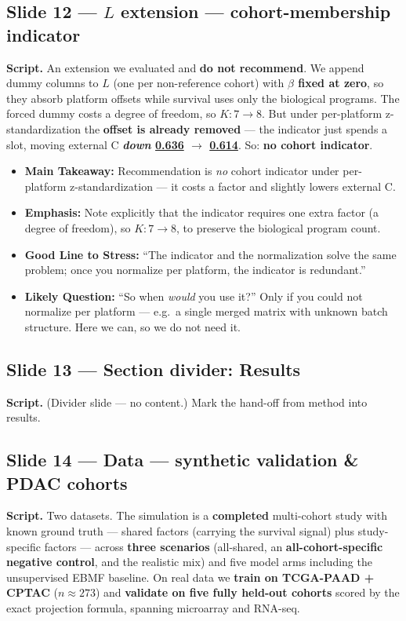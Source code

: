 \documentclass[11pt]{article}
\newcommand{\scriptlabel}{\textbf{Script. }}
\newcommand{\sectionlabel}[1]{\textbf{#1}}
\newcommand{\key}[1]{\textcolor{keyblue}{\textbf{#1}}}        %
\newcommand{\num}[1]{\textcolor{keycar}{\textbf{\uline{#1}}}} %
\begin{document}
\subsection*{Slide 12 --- $L$ extension --- cohort-membership indicator}
\scriptlabel An extension we evaluated and \key{do not recommend}. We append dummy columns to $L$
(one per non-reference cohort) with \key{$\beta$ fixed at zero}, so they absorb platform offsets
while survival uses only the biological programs. The forced dummy costs a degree of freedom, so
\key{$K: 7 \to 8$}. But under per-platform z-standardization the \key{offset is already removed} ---
the indicator just spends a slot, moving external C \key{\emph{down} \num{0.636} $\to$ \num{0.614}}.
So: \key{no cohort indicator}.

\begin{itemize}
\item \sectionlabel{Main Takeaway:} Recommendation is \emph{no} cohort indicator under per-platform
z-standardization --- it costs a factor and slightly lowers external C.
\item \sectionlabel{Emphasis:} Note explicitly that the indicator requires one extra factor (a
degree of freedom), so $K: 7 \to 8$, to preserve the biological program count.
\item \sectionlabel{Good Line to Stress:} ``The indicator and the normalization solve the same
problem; once you normalize per platform, the indicator is redundant.''
\item \sectionlabel{Likely Question:} ``So when \emph{would} you use it?'' Only if you could not
normalize per platform --- e.g.\ a single merged matrix with unknown batch structure. Here we can,
so we do not need it.
\end{itemize}

\subsection*{Slide 13 --- Section divider: Results}
\scriptlabel (Divider slide --- no content.) Mark the hand-off from method into results.

\subsection*{Slide 14 --- Data --- synthetic validation \& PDAC cohorts}
\scriptlabel Two datasets. The simulation is a \key{completed} multi-cohort study with known ground
truth --- shared factors (carrying the survival signal) plus study-specific factors --- across
\key{three scenarios} (all-shared, an \key{all-cohort-specific negative control}, and the realistic
mix) and five model arms including the unsupervised EBMF baseline. On real data we \key{train on
TCGA-PAAD + CPTAC} ($n \approx 273$) and \key{validate on five fully held-out cohorts} scored by the
exact projection formula, spanning microarray and RNA-seq.
\end{document}

